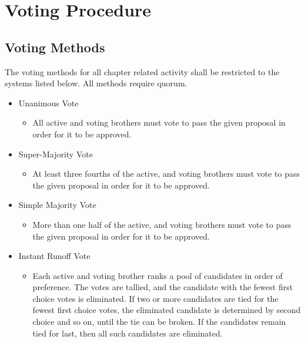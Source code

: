 \chapter{Voting Procedure}
\label{cha:voting-procedure}

\section{Voting Methods}
\label{sec:voting-methods}

The voting methods for all chapter related activity shall be restricted to the
systems listed below.
All methods require quorum.

\begin{itemize}
    \item Unanimous Vote
        \begin{itemize}
            \item All active and voting brothers must vote to pass the given
                proposal in order for it to be approved.
        \end{itemize}
    \item Super-Majority Vote
        \begin{itemize}
            \item At least three fourths of the active, and voting brothers must
                vote to pass the given proposal in order for it to be approved.
        \end{itemize}
    \item Simple Majority Vote
        \begin{itemize}
            \item More than one half of the active, and voting brothers must
                vote to pass the given proposal in order for it to be approved.
        \end{itemize} \item Instant Runoff Vote \begin{itemize} \item Each
                active and voting brother ranks a pool of candidates in order of
                preference.
                The votes are tallied, and the candidate with the fewest first
                choice votes is eliminated.
                If two or more candidates are tied for the fewest first choice
                votes, the eliminated candidate is determined by second choice
                and so on, until the tie can be broken.
                If the candidates remain tied for last, then all such candidates
                are eliminated.

\end{itemize}
\end{itemize}
